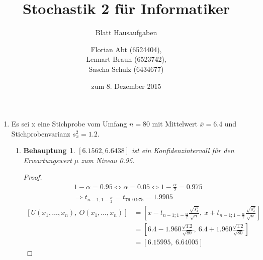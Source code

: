 \documentclass[a4paper]{scrartcl}
\title{Stochastik 2 für Informatiker}
\subtitle{Blatt {\blattnr} Hausaufgaben}
\author{
    Florian Abt (6524404), \\
    Lennart Braun (6523742), \\
    Sascha Schulz (6434677)
}
\date{zum 8. Dezember 2015}
\newtheorem*{behaupt}{Behauptung}
\newcommand{\gdw}{\Leftrightarrow}
\def \blattnr {8}
\begin{document}
\maketitle

\begin{enumerate}[label=\bfseries \blattnr.\arabic*]

    \item 
        Es sei x eine Stichprobe vom Umfang $n = 80$ mit Mittelwert
        $\overline{x} = \num{6,4}$ und Stichprobenvarianz $s_x^2 = \num{1,2}$.
        \begin{enumerate}
            \item 
                \begin{behaupt}
                    $[\num{6,1562}, \num{6,6438}]$
                    ist ein Konfidenzintervall für den Erwartungswert $\mu$ zum
                    Niveau \num{0,95}.
                \end{behaupt}
                \begin{proof}
                    \begin{gather*}
                        1 - \alpha = \num{0.95}
                        \gdw
                        \alpha = \num{0.05}
                        \gdw
                        1 - \frac{\alpha}{2} = \num{0.975}
                        \\
                        \Rightarrow t_{n-1; 1-\frac{\alpha}{2}}
                        =
                        t_{79; \num{0.975}} = \num{1.9905}
                    \end{gather*}
                    \begin{equation*}
                        \begin{split}
                            \left[ U(x_1, \dotsc, x_n),\ 
                            O(x_1, \dotsc, x_n) \right]
                            &= \left[ \overline{x} - t_{n-1; 1-\frac{\alpha}{2}}
                            \frac{\sqrt{s_x^2}}{\sqrt{n}},\ 
                            \overline{x} + t_{n-1; 1 - \frac{\alpha}{2}}
                            \frac{\sqrt{s_x^2}}{\sqrt{n}} \right] \\
                            &= \left[ \num{6.4} - \num{1.960}
                            \frac{\sqrt{\num{1.2}}}{\sqrt{80}},\ 
                            \num{6.4} + \num{1.960}
                            \frac{\sqrt{\num{1.2}}}{\sqrt{80}} \right] \\
                            &= \left[ \num{6.15995},\ \num{6.64005} \right]
                        \end{split}
                    \end{equation*}
                \end{proof}
    

\end{enumerate}
\end{enumerate}
\end{document}
